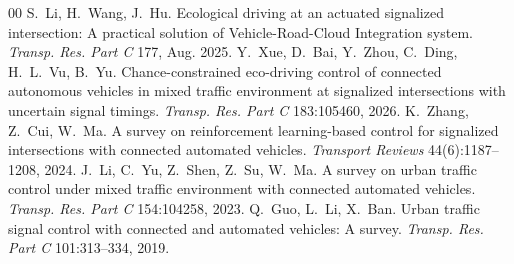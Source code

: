 \begin{thebibliography}{00}
 S.~Li, H.~Wang, J.~Hu. Ecological driving at an actuated signalized intersection: A practical solution of Vehicle-Road-Cloud Integration system. \emph{Transp. Res. Part C} 177, Aug. 2025.
 Y.~Xue, D.~Bai, Y.~Zhou, C.~Ding, H.~L.~Vu, B.~Yu. Chance-constrained eco-driving control of connected autonomous vehicles in mixed traffic environment at signalized intersections with uncertain signal timings. \emph{Transp. Res. Part C} 183:105460, 2026.
 K.~Zhang, Z.~Cui, W.~Ma. A survey on reinforcement learning-based control for signalized intersections with connected automated vehicles. \emph{Transport Reviews} 44(6):1187--1208, 2024.
 J.~Li, C.~Yu, Z.~Shen, Z.~Su, W.~Ma. A survey on urban traffic control under mixed traffic environment with connected automated vehicles. \emph{Transp. Res. Part C} 154:104258, 2023.
 Q.~Guo, L.~Li, X.~Ban. Urban traffic signal control with connected and automated vehicles: A survey. \emph{Transp. Res. Part C} 101:313--334, 2019.
\end{thebibliography}

\appendices
